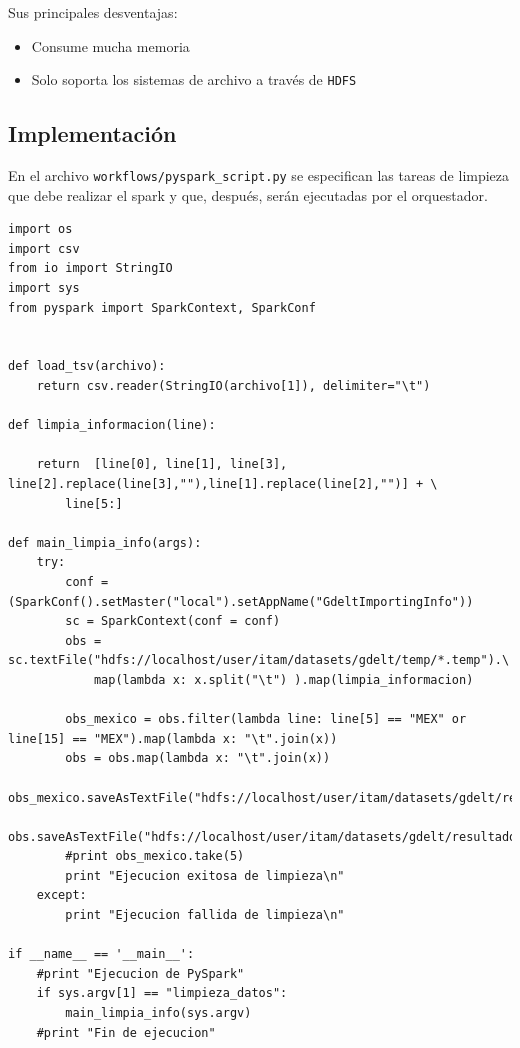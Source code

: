 \documentclass[]{article}
\begin{document}
Sus principales desventajas:

\begin{itemize}
\itemsep1pt\parskip0pt
\item
  Consume mucha memoria
\item
  Solo soporta los sistemas de archivo a través de \texttt{HDFS}
\end{itemize}

\subsection{Implementación}\label{implementacion-2}

En el archivo \texttt{workflows/pyspark\_script.py} se especifican las
tareas de limpieza que debe realizar el spark y que, después, serán
ejecutadas por el orquestador.

\begin{verbatim}
import os
import csv
from io import StringIO
import sys
from pyspark import SparkContext, SparkConf


def load_tsv(archivo):
    return csv.reader(StringIO(archivo[1]), delimiter="\t")

def limpia_informacion(line): 
    
    return  [line[0], line[1], line[3], line[2].replace(line[3],""),line[1].replace(line[2],"")] + \
        line[5:]

def main_limpia_info(args):
    try:
        conf = (SparkConf().setMaster("local").setAppName("GdeltImportingInfo"))
        sc = SparkContext(conf = conf)  
        obs = sc.textFile("hdfs://localhost/user/itam/datasets/gdelt/temp/*.temp").\
            map(lambda x: x.split("\t") ).map(limpia_informacion)

        obs_mexico = obs.filter(lambda line: line[5] == "MEX" or line[15] == "MEX").map(lambda x: "\t".join(x))
        obs = obs.map(lambda x: "\t".join(x))
        obs_mexico.saveAsTextFile("hdfs://localhost/user/itam/datasets/gdelt/resultados/mexico")
        obs.saveAsTextFile("hdfs://localhost/user/itam/datasets/gdelt/resultados/general")
        #print obs_mexico.take(5)
        print "Ejecucion exitosa de limpieza\n"
    except: 
        print "Ejecucion fallida de limpieza\n"

if __name__ == '__main__':
    #print "Ejecucion de PySpark"
    if sys.argv[1] == "limpieza_datos":
        main_limpia_info(sys.argv)
    #print "Fin de ejecucion"
\end{verbatim}
\end{document}
